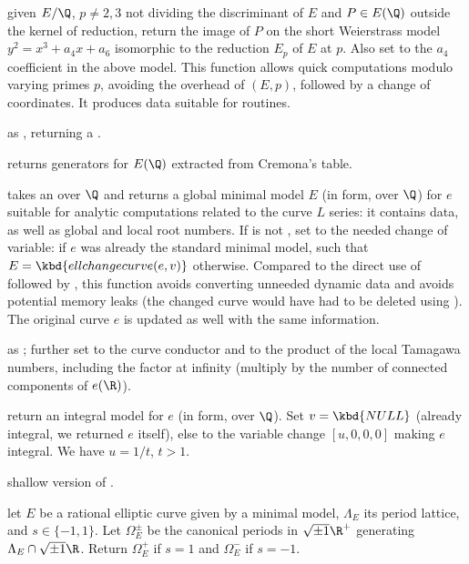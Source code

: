  given $E/\Q$,
$p\neq 2,3$ not dividing the discriminant of $E$ and $P\in E(\Q)$ outside the
kernel of reduction, return the image of $P$ on the short Weierstrass
model $y^2 = x^3 + a_4x + a_6$ isomorphic to the reduction $E_p$ of $E$ at $p$.
Also set  to the $a_4$ coefficient in the above model. This function
allows quick computations modulo varying primes $p$, avoiding the overhead of
$(E,p)$, followed by a change of coordinates. It produces data
suitable for  routines.

 as
, returning a .

 returns generators for $E(\Q)$
extracted from Cremona's table.

 takes an  over $\Q$
and returns a global minimal model $E$ (in  form, over $\Q$) for
$e$ suitable for analytic computations related to the curve $L$ series: it
contains  data, as well as global and local root numbers. If
 is not , set  to the needed change of variable:
 if $e$ was already the standard minimal model, such that $E =
\kbd{ellchangecurve(e,v)}$ otherwise. Compared to the direct use of
 followed by , this function avoids
converting unneeded dynamic data and avoids potential memory leaks
(the changed curve would have had to be deleted using ). The
original curve $e$ is updated as well with the same information.

 as
; further set  to the curve conductor
and  to the product of the local Tamagawa numbers, including
the factor at infinity (multiply by the number of connected components
of $e(\R)$).

 return an integral model
for $e$ (in  form, over $\Q$). Set $v = \kbd{NULL}$ (already
integral, we returned $e$ itself), else to the variable change
$[u,0,0,0]$ making $e$ integral. We have $u = 1/t$, $t > 1$.

 shallow version of
 .

 let $E$ be a rational elliptic
curve given by a minimal model, $\Lambda_E$ its period lattice, and
$s\in\{-1,1\}$. Let $\Omega_E^\pm$ be the canonical periods in
$\sqrt{\pm 1}\R^+$ generating $\Lambda_E \cap \sqrt{\pm 1} \R$.
Return $\Omega_E^+$ if $s = 1$ and $\Omega_E^-$ if $s = -1$.


